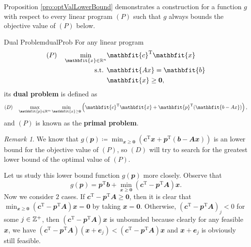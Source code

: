 \documentclass[math, code]{amznotes}
\theoremstyle{remark}
\newtheorem*{remark}{Remark}
\begin{document}
Proposition \ref{pro:optValLowerBound} demonstrates a construction for a function $g$ with respect to every linear program $(P)$ such that $g$ always bounds the objective value of $(P)$ below. 
\begin{dfnbox}{Dual Problem}{dualProb}
    For any linear program 
    \begin{align*}
        (P) \quad \min_{\mathbfit{x} \in \R^n} & \mathbfit{c}^{\mathrm{T}}\mathbfit{x} \\
        \textrm{s.t. } & \mathbfit{Ax} = \mathbfit{b} \\
        & \mathbfit{x} \geq \mathbf{0},
    \end{align*}
    its {\color{red} \textbf{dual problem}} is defined as 
    \begin{align*}
        (D) \quad \max_{\mathbfit{p} \in \R^m}\min_{\mathbfit{x} \geq \mathbf{0}}\left(\mathbfit{c}^{\mathrm{T}}\mathbfit{x} + \mathbfit{p}^{\mathrm{T}}(\mathbfit{b - Ax})\right),
    \end{align*}
    and $(P)$ is known as the {\color{red} \textbf{primal problem}}.
\end{dfnbox}
\begin{notebox}
    \begin{remark}
        We know that $g(\mathbfit{p}) \coloneqq \min_{\mathbfit{x} \geq \mathbf{0}}\left(\mathbfit{c}^{\mathrm{T}}\mathbfit{x} + \mathbfit{p}^{\mathrm{T}}(\mathbfit{b - Ax})\right)$ is an lower bound for the objective value of $(P)$, so $(D)$ will try to search for the greatest lower bound of the optimal value of $(P)$.
    \end{remark}
\end{notebox}
Let us study this lower bound function $g(\mathbfit{p})$ more closely. Observe that 
\begin{equation*}
    g(\mathbfit{p}) = \mathbfit{p}^{\mathrm{T}}\mathbfit{b} + \min_{\mathbfit{x} \geq \mathbf{0}}\left(\mathbfit{c}^{\mathrm{T}} - \mathbfit{p}^{\mathrm{T}}\mathbfit{A}\right)\mathbfit{x}.
\end{equation*}
Now we consider $2$ cases. If $\mathbfit{c}^{\mathrm{T}} - \mathbfit{p}^{\mathrm{T}}\mathbfit{A} \geq \mathbf{0}$, then it is clear that $\min_{\mathbfit{x} \geq \mathbf{0}}\left(\mathbfit{c}^{\mathrm{T}} - \mathbfit{p}^{\mathrm{T}}\mathbfit{A}\right)\mathbfit{x} = \mathbf{0}$ by taking $\mathbfit{x} = \mathbf{0}$. Otherwise, $(\mathbfit{c}^{\mathrm{T}} - \mathbfit{p}^{\mathrm{T}}\mathbfit{A})_j < 0$ for some $j \in \mathbb{Z}^+$, then $\left(\mathbfit{c}^{\mathrm{T}} - \mathbfit{p}^{\mathrm{T}}\mathbfit{A}\right)\mathbfit{x}$ is unbounded because clearly for any feasible $\mathbfit{x}$, we have $\left(\mathbfit{c}^{\mathrm{T}} - \mathbfit{p}^{\mathrm{T}}\mathbfit{A}\right)\left(\mathbfit{x} + \mathbfit{e}_j\right) < \left(\mathbfit{c}^{\mathrm{T}} - \mathbfit{p}^{\mathrm{T}}\mathbfit{A}\right)\mathbfit{x}$ and $\mathbfit{x} + \mathbfit{e}_j$ is obviously still feasible. 
\end{document}
